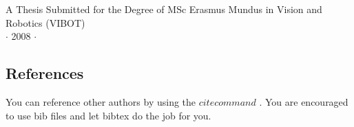 \vspace{2cm}
\begin{center}
{\large A Thesis Submitted for the Degree of MSc Erasmus Mundus in
Vision and Robotics (VIBOT)\\ \vspace{0.3cm} $\cdot$ 2008 $\cdot$}
\end{center}


\subsection{References}
You can reference other authors by using the $cite command$
\cite{Pokorski:1998hr}. You are encouraged to use bib files and
let bibtex do the job for you.
